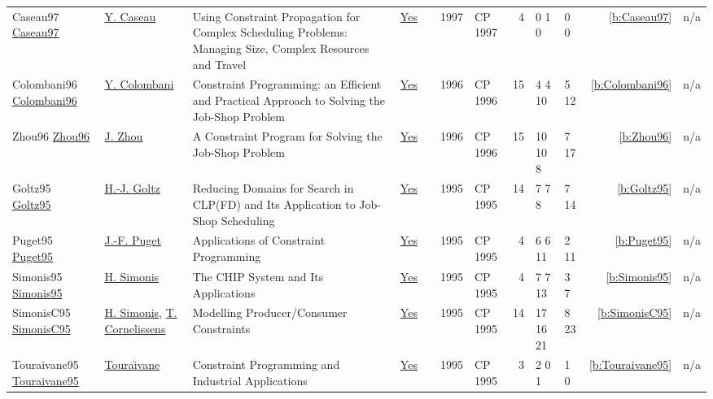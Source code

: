 {\begin{longtable}{>{\raggedright\arraybackslash}p{3cm}>{\raggedright\arraybackslash}p{4.5cm}>{\raggedright\arraybackslash}p{6.0cm}rrrp{2.5cm}rp{1cm}p{1cm}rr}
Caseau97 \href{https://doi.org/10.1007/BFb0017437}{Caseau97} & \hyperref[auth:a301]{Y. Caseau} & Using Constraint Propagation for Complex Scheduling Problems: Managing Size, Complex Resources and Travel & \href{../works/Caseau97.pdf}{Yes} & \cite{Caseau97} & 1997 & CP 1997 & 4 & 0 1 0 & 0 0 & \ref{b:Caseau97} & n/a\\
Colombani96 \href{https://doi.org/10.1007/3-540-61551-2_72}{Colombani96} & \hyperref[auth:a168]{Y. Colombani} & Constraint Programming: an Efficient and Practical Approach to Solving the Job-Shop Problem & \href{../works/Colombani96.pdf}{Yes} & \cite{Colombani96} & 1996 & CP 1996 & 15 & 4 4 10 & 5 12 & \ref{b:Colombani96} & n/a\\
Zhou96 \href{https://doi.org/10.1007/3-540-61551-2_97}{Zhou96} & \hyperref[auth:a176]{J. Zhou} & A Constraint Program for Solving the Job-Shop Problem & \href{../works/Zhou96.pdf}{Yes} & \cite{Zhou96} & 1996 & CP 1996 & 15 & 10 10 8 & 7 17 & \ref{b:Zhou96} & n/a\\
Goltz95 \href{https://doi.org/10.1007/3-540-60299-2_33}{Goltz95} & \hyperref[auth:a304]{H.-J. Goltz} & Reducing Domains for Search in {CLP(FD)} and Its Application to Job-Shop Scheduling & \href{../works/Goltz95.pdf}{Yes} & \cite{Goltz95} & 1995 & CP 1995 & 14 & 7 7 8 & 7 14 & \ref{b:Goltz95} & n/a\\
Puget95 \href{https://doi.org/10.1007/3-540-60299-2_43}{Puget95} & \hyperref[auth:a305]{J.-F. Puget} & Applications of Constraint Programming & \href{../works/Puget95.pdf}{Yes} & \cite{Puget95} & 1995 & CP 1995 & 4 & 6 6 11 & 2 11 & \ref{b:Puget95} & n/a\\
Simonis95 \href{https://doi.org/10.1007/3-540-60299-2_42}{Simonis95} & \hyperref[auth:a17]{H. Simonis} & The {CHIP} System and Its Applications & \href{../works/Simonis95.pdf}{Yes} & \cite{Simonis95} & 1995 & CP 1995 & 4 & 7 7 13 & 3 7 & \ref{b:Simonis95} & n/a\\
SimonisC95 \href{https://doi.org/10.1007/3-540-60299-2_27}{SimonisC95} & \hyperref[auth:a17]{H. Simonis}, \hyperref[auth:a303]{T. Cornelissens} & Modelling Producer/Consumer Constraints & \href{../works/SimonisC95.pdf}{Yes} & \cite{SimonisC95} & 1995 & CP 1995 & 14 & 17 16 21 & 8 23 & \ref{b:SimonisC95} & n/a\\
Touraivane95 \href{https://doi.org/10.1007/3-540-60299-2_41}{Touraivane95} & \hyperref[auth:a306]{Toura{\"{\i}}vane} & Constraint Programming and Industrial Applications & \href{../works/Touraivane95.pdf}{Yes} & \cite{Touraivane95} & 1995 & CP 1995 & 3 & 2 0 1 & 1 0 & \ref{b:Touraivane95} & n/a\\
\end{longtable}
}

